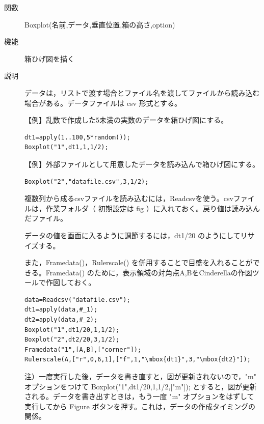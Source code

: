 \documentclass[papersize,a4paper,12pt,uplatex]{jsarticle}
\begin{document}
\begin{description}

\hypertarget{boxplot}{}
\item[関数]Boxplot(名前,データ,垂直位置,箱の高さ,option)
\item[機能]箱ひげ図を描く
\item[説明]データは，リストで渡す場合とファイル名を渡してファイルから読み込む場合がある。データファイルは csv 形式とする。

\vspace{\baselineskip}
【例】乱数で作成した5未満の実数のデータを箱ひげ図にする。

\begin{verbatim}
dt1=apply(1..100,5*random());
Boxplot("1",dt1,1,1/2);
\end{verbatim}
\vspace{\baselineskip}
\hspace{20mm} 

\vspace{\baselineskip}
【例】外部ファイルとして用意したデータを読み込んで箱ひげ図にする。
\begin{verbatim}
Boxplot("2","datafile.csv",3,1/2);
\end{verbatim}

\vspace{\baselineskip}
複数列から成るcsvファイルを読み込むには，Readcsvを使う。csvファイルは，作業フォルダ（ 初期設定は fig ）に入れておく。戻り値は読み込んだファイル。

データの値を画面に入るように調節するには，dt1/20 のようにしてリサイズする。
 
また，Framedata()，Rulerscale() を併用することで目盛を入れることができる。Framedata() のために，表示領域の対角点A,BをCinderellaの作図ツールで作図しておく。

\begin{verbatim}
data=Readcsv("datafile.csv");
dt1=apply(data,#_1);
dt2=apply(data,#_2);
Boxplot("1",dt1/20,1,1/2);
Boxplot("2",dt2/20,3,1/2);
Framedata("1",[A,B],["corner"]);
Rulerscale(A,["r",0,6,1],["f",1,"\mbox{dt1}",3,"\mbox{dt2}"]);
\end{verbatim}
 \begin{center}  \end{center}

注）一度実行した後，データを書き直すと，図が更新されないので，"m" オプションをつけて
Boxplot("1",dt1/20,1,1/2,["m"]); とすると，図が更新される。データを書き出すときは，もう一度 "m" オプションをはずして実行してから Figure ボタンを押す。これは，データの作成タイミングの関係。


\end{description}
\end{document}
